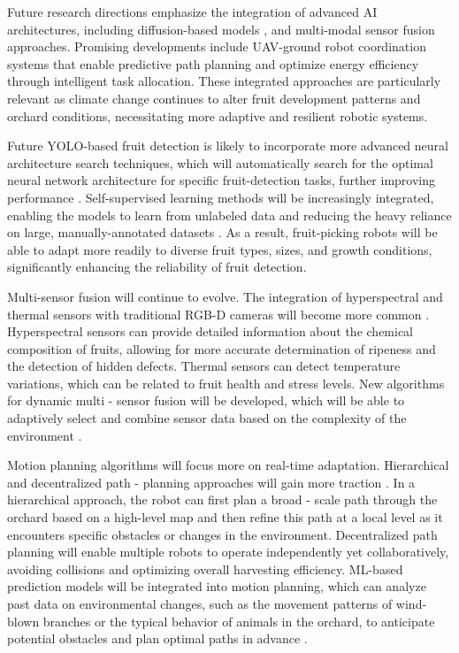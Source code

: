 \documentclass[pdflatex,sn-mathphys-num]{sn-jnl}
\begin{document}
Future research directions emphasize the integration of advanced AI architectures, including diffusion-based models \cite{heschl2024synthset}, and multi-modal sensor fusion approaches. Promising developments include UAV-ground robot coordination systems that enable predictive path planning and optimize energy efficiency through intelligent task allocation. These integrated approaches are particularly relevant as climate change continues to alter fruit development patterns and orchard conditions, necessitating more adaptive and resilient robotic systems.

Future YOLO-based fruit detection is likely to incorporate more advanced neural architecture search techniques, which will automatically search for the optimal neural network architecture for specific fruit-detection tasks, further improving performance \cite{hou2023overview, suresh2023selective}. Self-supervised learning methods will be increasingly integrated, enabling the models to learn from unlabeled data and reducing the heavy reliance on large, manually-annotated datasets \cite{suresh2023selective, zhang2024automatic}. As a result, fruit-picking robots will be able to adapt more readily to diverse fruit types, sizes, and growth conditions, significantly enhancing the reliability of fruit detection.

Multi-sensor fusion will continue to evolve. The integration of hyperspectral and thermal sensors with traditional RGB-D cameras will become more common \cite{mohamed2021smart, martos2021ensuring}. Hyperspectral sensors can provide detailed information about the chemical composition of fruits, allowing for more accurate determination of ripeness and the detection of hidden defects. Thermal sensors can detect temperature variations, which can be related to fruit health and stress levels. New algorithms for dynamic multi - sensor fusion will be developed, which will be able to adaptively select and combine sensor data based on the complexity of the environment \cite{liu2024hierarchical}.

Motion planning algorithms will focus more on real-time adaptation. Hierarchical and decentralized path - planning approaches will gain more traction \cite{lytridis2021overview, li2023multi}. In a hierarchical approach, the robot can first plan a broad - scale path through the orchard based on a high-level map and then refine this path at a local level as it encounters specific obstacles or changes in the environment. Decentralized path planning will enable multiple robots to operate independently yet collaboratively, avoiding collisions and optimizing overall harvesting efficiency. ML-based prediction models will be integrated into motion planning, which can analyze past data on environmental changes, such as the movement patterns of wind-blown branches or the typical behavior of animals in the orchard, to anticipate potential obstacles and plan optimal paths in advance \cite{rajendran2024towards}.
\end{document}
